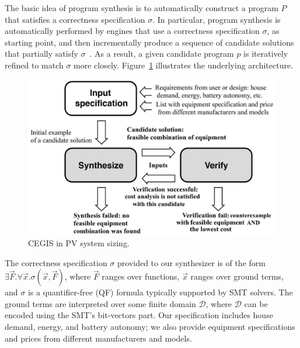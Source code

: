 \documentclass[runningheads]{llncs}
\begin{document}
The basic idea of program synthesis is to automatically construct a program $P$ that satisfies a correctness specification $\sigma$. In particular, program synthesis is automatically performed by engines that use a correctness specification $\sigma$, as starting point, and then incrementally produce a sequence of candidate solutions that partially satisfy $\sigma$~\cite{Abateetal2017}. As a result, a given candidate program $p$ is iteratively refined to match $\sigma$ more closely. Figure~\ref{Counter-Example-Guided-Inductive-Synthesis} illustrates the underlying architecture. 
%
\begin{figure}
\begin{center}
	\includegraphics[width=0.5\columnwidth]{fig2_rev2.jpg}
\end{center}	
	\caption{CEGIS in PV system sizing.}
	\label{Counter-Example-Guided-Inductive-Synthesis}
\end{figure}

The correctness specification $\sigma$ provided to our synthesizer is of the form $\exists \vec{F}. \forall \vec{x}. \sigma(\vec{x}, \vec{F})$, where $\vec{F}$ ranges over functions, $\vec{x}$ ranges over ground terms, and $\sigma$ is a quantifier-free (QF) formula typically supported by SMT solvers. The ground terms are interpreted over some finite domain $\mathcal{D}$, where $\mathcal{D}$ can be encoded using the SMT's bit-vectors part. Our specification includes house demand, energy, and battery autonomy; we also provide equipment specifications and prices from different manufacturers and models.
\end{document}
